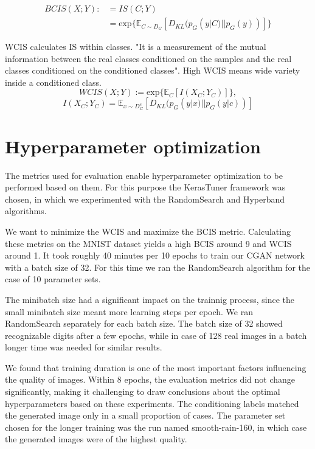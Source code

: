 \documentclass[lettersize,journal]{IEEEtran}
\begin{document}
\begin{align}
    BCIS(X;Y):&= IS(C;Y)\\
    &= \text{exp} \{ \mathbb{E}_{C \sim D_G}[D_{KL}(p_G(y|C)||p_G(y))]\}
\end{align}

WCIS calculates IS within classes. "It is a measurement of the mutual information between the
real classes conditioned on the samples and the real classes conditioned on the conditioned classes". High WCIS means wide variety inside a conditioned class.
\begin{equation}
    WCIS(X;Y) := \text{exp} \{\mathbb{E}_{C}[I(X_C;Y_C)]\},
\end{equation}
\begin{equation}
    I(X_C;Y_C) = \mathbb{E}_{x \sim D^e_G}[D_{KL}(p_G(y|x)||p_G(y|c))]
\end{equation}

\section{Hyperparameter optimization}
The metrics used for evaluation enable hyperparameter optimization to be performed based on them. For this purpose the KerasTuner framework was chosen, in which we experimented with the RandomSearch and Hyperband algorithms.

\vspace*{1em}We want to minimize the WCIS and maximize the BCIS metric. Calculating these metrics on the MNIST dataset yields a high BCIS around 9 and WCIS around 1. It took roughly 40 minutes per 10 epochs to train our CGAN network with a batch size of 32. For this time we ran the RandomSearch algorithm for the case of 10 parameter sets.

\vspace*{1em}The minibatch size had a significant impact on the trainnig process, since the small minibatch size meant more learning steps per epoch. We ran RandomSearch separately for each batch size. The batch size of 32 showed recognizable digits after a few epochs, while in case of 128 real images in a batch longer time was needed for similar results.

\vspace*{1em}We found that training duration is one of the most important factors influencing the quality of images. Within 8 epochs, the evaluation metrics did not change significantly, making it challenging to draw conclusions about the optimal hyperparameters based on these experiments. The conditioning labels matched the generated image only in a small proportion of cases. The parameter set chosen for the longer training was the run named smooth-rain-160, in which case the generated images were of the highest quality.
\end{document}
